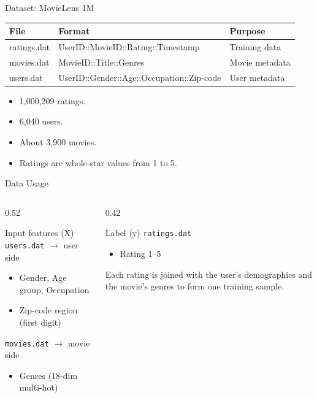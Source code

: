 \documentclass[aspectratio=169]{beamer}
\begin{document}
\begin{frame}{Dataset: MovieLens 1M}
\begin{table}
\centering
\begin{tabular}{lll}
\toprule
\textbf{File} & \textbf{Format} & \textbf{Purpose} \\
\midrule
ratings.dat & UserID::MovieID::Rating::Timestamp & Training data \\
movies.dat & MovieID::Title::Genres & Movie metadata \\
users.dat & UserID::Gender::Age::Occupation::Zip-code & User metadata \\
\bottomrule
\end{tabular}
\end{table}

\vspace{0.3cm}

\begin{itemize}
  \item 1,000,209 ratings.
  \item 6,040 users.
  \item About 3,900 movies.
  \item Ratings are whole-star values from 1 to 5.
\end{itemize}
\end{frame}

\begin{frame}{Data Usage}
\begin{columns}
  \begin{column}{0.52\textwidth}
    \begin{block}{Input features (X)}
      \texttt{users.dat} $\rightarrow$ user side
      \begin{itemize}
        \item Gender, Age group, Occupation
        \item Zip-code region (first digit)
      \end{itemize}
      \texttt{movies.dat} $\rightarrow$ movie side
      \begin{itemize}
        \item Genres (18-dim multi-hot)
      \end{itemize}
    \end{block}
  \end{column}
  \begin{column}{0.42\textwidth}
    \begin{block}{Label (y)}
      \texttt{ratings.dat}
      \begin{itemize}
        \item Rating 1--5
      \end{itemize}
      Each rating is joined with the user's demographics and the movie's genres
      to form one training sample.
    \end{block}
  \end{column}
\end{columns}
\end{frame}
\end{document}
